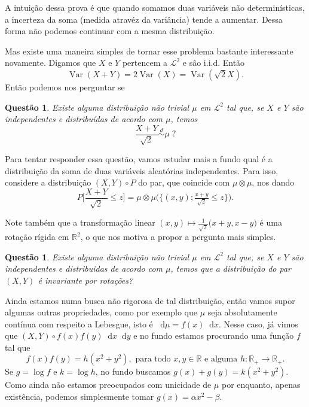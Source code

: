 \documentclass[reqno, draft]{book}
\newcommand*\1{\mathds{1}}
\newtheorem{question}[theorem]{Questão}
\DeclareMathOperator{\Var}{Var}
\def \distr{\overset{d}{\sim}}
\renewcommand*\d{\mathop{}\!\mathrm{d}}
\begin{document}
A intuição dessa prova é que quando somamos duas variáveis não determinísticas, a incerteza da soma (medida atravéz da variância) tende a aumentar.
Dessa forma não podemos continuar com a mesma distribuição.

Mas existe uma maneira simples de tornar esse problema bastante interessante novamente.
Digamos que $X$ e $Y$ pertencem a $\mathcal{L}^2$ e são i.i.d.
Então
\begin{equation}
  \Var(X + Y) = 2 \Var(X) = \Var(\sqrt{2} X).
\end{equation}
Então podemos nos perguntar se

\begin{question}
  \label{q:ponto_fixo_soma}
  Existe alguma distribuição não trivial $\mu$ em $\mathcal{L}^2$ tal que, se $X$ e $Y$ são independentes e distribuídas de acordo com $\mu$, temos
  \begin{equation}
    \frac{X + Y}{\sqrt{2}} \distr \mu \; ?
  \end{equation}
\end{question}

Para tentar responder essa questão, vamos estudar mais a fundo qual é a distribuição da soma de duas variáveis aleatórias independentes.
Para isso, considere a distribuição $(X,Y) \circ P$ do par, que coincide com $\mu \otimes \mu$, nos dando
\begin{equation}
  P\Big[ \frac{X + Y}{\sqrt{2}} \leq z \Big] = \mu \otimes \mu \big( \big\{(x, y); \tfrac{x + y}{\sqrt{2}} \leq z \big\} \big).
\end{equation}

Note também que a transformação linear $(x,y) \mapsto \tfrac{1}{\sqrt{2}}\big(x + y, x - y\big)$ é uma rotação rígida em $\mathbb{R}^2$, o que nos motiva a propor a pergunta mais simples.

\begin{question}
  Existe alguma distribuição não trivial $\mu$ em $\mathcal{L}^2$ tal que, se $X$ e $Y$ são independentes e distribuídas de acordo com $\mu$, temos que a distribuição do par $(X,Y)$ é invariante por rotações?
\end{question}

Ainda estamos numa busca não rigorosa de tal distribuição, então vamos supor algumas outras propriedades, como por exemplo que $\mu$ seja absolutamente contínua com respeito a Lebesgue, isto é $\d \mu = f(x) \d x$.
Nesse caso, já vimos que $(X, Y) \circ f(x) f(y) \d x \d y$ e no fundo estamos procurando uma função $f$ tal que
\begin{equation}
  f(x) f(y) = h(x^2 + y^2), \text{ para todo $x, y \in \mathbb{R}$ e alguma $h: \mathbb{R}_+ \to \mathbb{R}_+$.}
\end{equation}
Se $g = \log f$ e $k = \log h$, no fundo buscamos $g(x) + g(y) = k(x^2 + y^2)$.
Como ainda não estamos preocupados com unicidade de $\mu$ por enquanto, apenas existência, podemos simplesmente tomar $g(x) = \alpha x^2 - \beta$.
\end{document}
